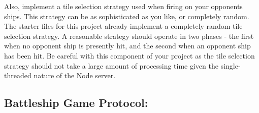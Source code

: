 \documentclass[10pt]{article}
\begin{document}
Also, implement a tile selection strategy used when firing on your opponents ships. This strategy can be as sophisticated as you like, or completely random. The starter files for this project already implement a completely random tile selection strategy. A reasonable strategy should operate in two phases - the first when no opponent ship is presently hit, and the second when an opponent ship has been hit. Be careful with this component of your project as the tile selection strategy should not take a large amount of processing time given the single-threaded nature of the Node server. 

\subsection*{Battleship Game Protocol:}
\end{document}
